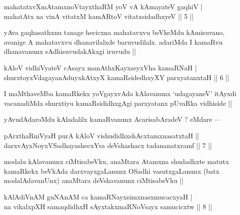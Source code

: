 
\begin{shl}
mahatatxvXmAtamxnoV\s tayxthaRM yoV vA kAmayateV gaqhiV | \\
mahatAtx na vinA vitatxM kamARtoV vitatxsidadhxyeV \hfill|| 5 || 
\end{shl}

\begin{artha}
yAva gaqhasathxnu tanage hecicxna mahatavxvu beVkeMdu kAmisuvano, avanige A mahatavxvu dhanavilalxde baruvudilalx. adariMda I kamaRvu dhanavanunx sAdhisuvudakAkxgi iruvudu ||
\end{artha}


\begin{shl}
kAloV vidhiVyateV cAsayx manAthxKayxseyxVha kamaRNaH | \\
shurxtoyxVdagayanAduyxkAtxyX kamaRsidedhxyXY parxyatanxtaH \hfill|| 6 || 
\end{shl}

\begin{artha}
I maMthaveMba kamaRkekx yoVgayxvAda kAlavanunx `udagayaneV' itAyxdi vacanadiMda shurxtiyu kamaRsididhxgAgi parxyatanx pUvaRka vidhiside ||
\end{artha}

\begin{artha}
yAvudAdaroMdu kAladalilx kamaRvanunx AcarisabAradeV ? eMdare ---
\end{artha}

\begin{shl}
pArxthaRniVyaH purA kAloV vishudidhxshAcx\s \s tamxnasatxtaH || \\
darxvAyxNoyxVSadhayashecxYva deVshashacx tadananatxramf \hfill|| 7 || 
\end{shl}

\begin{artha}
modalu kAlavanunx ciMtisabeVku, anaMtara Atamxna shudadhxte matutx kamaRkekx beVkAda darxvayxgaLanunx OSadhi vasutxgaLanunx (batx modalAdavanUnx) anaMtara deVshavanunx ciMtisabeVku ||
\end{artha}

\begin{shl}
kAlAdiVnAM guNAnAM ca kamaRNayxsimxnasxmucacxyaH | \\
na vikalxpXH samaqdidhxH sAyxtakxmaRNoV\s sayx samucicxtw \hfill|| 8 || 
\end{shl}

